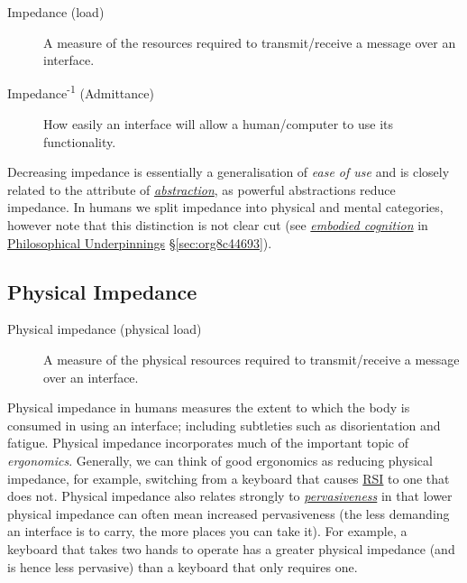 \documentclass[logo,bsc,singlespacing,parskip]{infthesis}
\begin{document}
\begin{mdframed}
\begin{description}
\item[{Impedance\label{impedance} (load)}] A measure of the resources required to transmit/receive a message over an interface.

\item[{Impedance\textsuperscript{-1} (Admittance)}] How easily an interface will allow a human/computer to use its functionality.
\end{description}
\end{mdframed}

Decreasing impedance is essentially a generalisation of \emph{ease of use} and is closely related to the attribute of \emph{\hyperref[abstraction]{abstraction}}, as powerful abstractions reduce impedance.
In humans we split impedance into physical and mental categories, however note that this distinction is not clear cut (see \emph{\hyperref[org68031b0]{embodied cognition}} in \hyperref[sec:org8c44693]{Philosophical Underpinnings} \S \ref{sec:org8c44693}).
\subsection{Physical Impedance}
\label{sec:orgdbb4f0a}
\medskip
\begin{mdframed}
\begin{description}
\item[{Physical impedance\label{physical impedance} (physical load)}] A measure of the physical resources required to transmit/receive a message over an interface.
\end{description}
\end{mdframed}

Physical impedance in humans measures the extent to which the body is consumed in using an interface; including subtleties such as disorientation and fatigue.
Physical impedance incorporates much of the important topic of \emph{ergonomics}.
Generally, we can think of good ergonomics as reducing physical impedance, for example, switching from a keyboard that causes \hyperref[orgc186d45]{RSI} to one that does not.
Physical impedance also relates strongly to \emph{\hyperref[pervasiveness]{pervasiveness}} in that lower physical impedance can often mean increased pervasiveness (the less demanding an interface is to carry, the more places you can take it).
For example, a keyboard that takes two hands to operate has a greater physical impedance (and is hence less pervasive) than a keyboard that only requires one.
\end{document}
